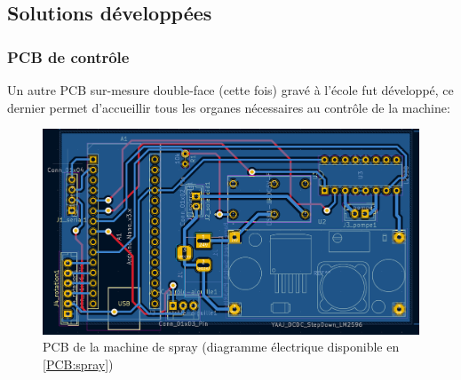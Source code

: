 \newpage
\subsection{Solutions développées}
\subsubsection{PCB de contrôle}
Un autre PCB sur-mesure double-face (cette fois) gravé à l'école fut développé, ce dernier permet d'accueillir tous les organes
nécessaires au contrôle de la machine:
\begin{figure}[H]
    \centering
    \includegraphics[width = \textwidth]{assets/figures/ameliorations/PCB_spray_kicad.png}
    \caption{PCB de la machine de spray (diagramme électrique disponible en \autoref{PCB:spray})}
\end{figure}

\newpage


